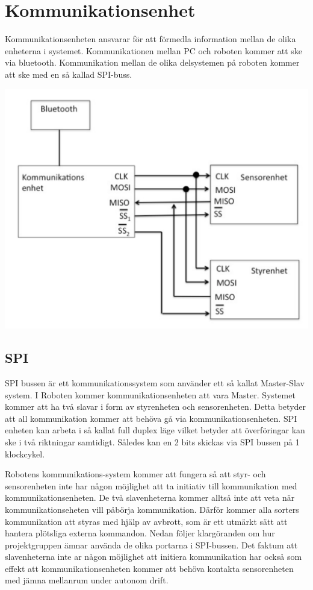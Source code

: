 \section{Kommunikationsenhet}

Kommunikationsenheten ansvarar för att förmedla information mellan de olika enheterna i systemet. 
Kommunikationen mellan PC och roboten kommer att ske via bluetooth. Kommunikation mellan de olika delsystemen på roboten kommer att ske med en så kallad SPI-buss.

\includegraphics[angle=270,scale=0.5]{SPI-buss.pdf}


\subsection{SPI}
SPI bussen är ett kommunikationssystem som använder ett så kallat Master-Slav system. I Roboten kommer kommunikationsenheten att vara Master. Systemet kommer att ha två slavar i form av styrenheten och sensorenheten.
Detta betyder att all kommunikation kommer att behöva gå via kommunikationsenheten. SPI enheten kan arbeta i så kallat full duplex läge vilket betyder att överföringar kan ske i två riktningar samtidigt. Således kan en 2 bits skickas via SPI bussen på 1 klockcykel.

Robotens kommunikations-system kommer att fungera så att styr- och sensorenheten inte har någon möjlighet att ta initiativ till kommunikation med kommunikationsenheten. De två slavenheterna kommer alltså inte att veta när kommunikationseheten vill påbörja kommunikation. Därför kommer alla sorters kommunikation att styras med hjälp av avbrott, som är ett utmärkt sätt att hantera plötsliga externa kommandon. 
Nedan följer klargöranden om hur projektgruppen ämnar använda de olika portarna i SPI-bussen. Det faktum att slavenheterna inte ar någon möjlighet att initiera kommunikation har också som effekt att kommunikationsenheten kommer att behöva kontakta sensorenheten med jämna mellanrum under autonom drift. 

